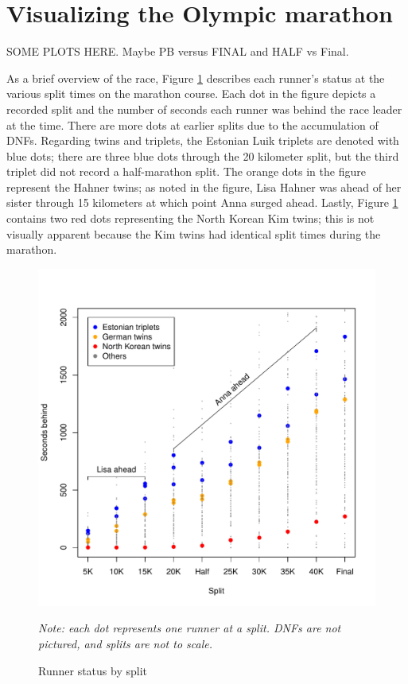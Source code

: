 \documentclass[12pt,titlepage]{article}
\begin{document}
\section*{Visualizing the Olympic marathon}

SOME PLOTS HERE.  Maybe PB versus FINAL and HALF vs Final.  

As a brief overview of the race, Figure \ref{fig:secondsbehind}
describes each runner's status at the various split times on the
marathon course.  Each dot in the figure depicts a recorded split and
the number of seconds each runner was behind the race leader at the
time.  There are more dots at earlier splits due to the accumulation
of DNFs.  Regarding twins and triplets, the Estonian Luik triplets are
denoted with blue dots; there are three blue dots through the 20
kilometer split, but the third triplet did not record a half-marathon
split.  The orange dots in the figure represent the Hahner twins; as
noted in the figure, Lisa Hahner was ahead of her sister through 15
kilometers at which point Anna surged ahead.  Lastly, Figure
\ref{fig:secondsbehind} contains two red dots representing the North
Korean Kim twins; this is not visually apparent because the Kim twins
had identical split times during the marathon.

\begin{figure}[!ht]
  \centering
  \caption{Runner status by split}
  \label{fig:secondsbehind}
  \includegraphics[scale = 1]{seconds-behind.pdf}
  \begin{flushleft}
    \emph{Note: each dot represents one runner at a split.  DNFs are
      not pictured, and splits are not to scale.}
  \end{flushleft}
\end{figure}
\end{document}
